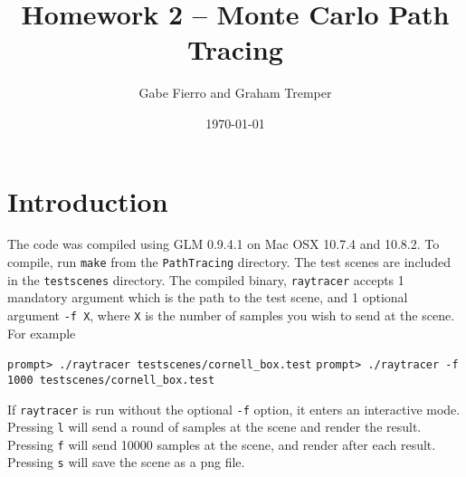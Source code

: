 \documentclass[11pt]{article}
\begin{document}
\title{Homework 2 -- Monte Carlo Path Tracing}
\author{Gabe Fierro and Graham Tremper}
\date{\today}
\maketitle

\section{Introduction}

The code was compiled using GLM 0.9.4.1 on Mac OSX 10.7.4 and 10.8.2. To compile, run \verb`make` from
the \verb`PathTracing` directory. The test scenes are included in the \verb`testscenes` directory. The
compiled binary, \verb`raytracer` accepts 1 mandatory argument which is the path to the test scene, and
1 optional argument \verb`-f X`, where \verb`X` is the number of samples you wish to send at the scene.
For example

\begin{center}
	\verb`prompt> ./raytracer testscenes/cornell_box.test`
	\verb`prompt> ./raytracer -f 1000 testscenes/cornell_box.test`
\end{center}

If \verb`raytracer` is run without the optional \verb`-f` option, it enters an interactive mode. Pressing \verb`l`
will send a round of samples at the scene and render the result. Pressing \verb`f` will send 10000 samples
at the scene, and render after each result. Pressing \verb`s` will save the scene as a png file.
\end{document}
